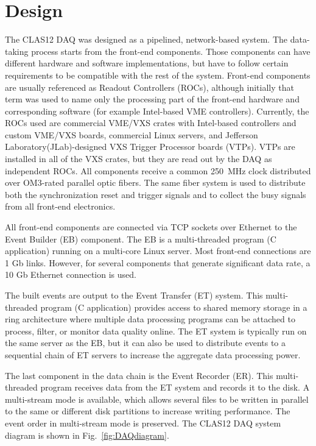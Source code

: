 \section{Design}

The CLAS12 DAQ was designed as a pipelined, network-based system. The data-taking process starts from the front-end components. Those components can have different hardware and software implementations, but have to follow certain requirements to be compatible with the rest of the system. Front-end components are usually referenced as Readout Controllers (ROCs), although initially that term was used to name only the processing part of the front-end hardware and corresponding software (for example Intel-based VME controllers). Currently, the ROCs used are commercial VME/VXS crates with Intel-based controllers and custom VME/VXS boards, commercial Linux servers, and Jefferson Laboratory(JLab)-designed VXS Trigger Processor boards (VTPs). VTPs are installed in all of the VXS crates, but they are read out by the DAQ as independent ROCs. All components receive a common 250~MHz clock distributed over OM3-rated parallel optic fibers. The same fiber system is used to distribute both the synchronization reset and trigger signals and to collect the busy signals from all front-end electronics.

All front-end components are connected via TCP sockets over Ethernet to the Event Builder (EB) component. The EB is a multi-threaded program (C application) running on a multi-core Linux server. Most front-end connections are 1 Gb links. However, for several components that generate significant data rate, a 10 Gb Ethernet connection is used.

The built events are output to the Event Transfer (ET) system. This multi-threaded program (C application) provides access to shared memory storage in a ring architecture where multiple data processing programs can be attached to process, filter, or monitor data quality online. The ET system is typically run on the same server as the EB, but it can also be used to distribute events to a sequential chain of ET servers to increase the aggregate data processing power.

The last component in the data chain is the Event Recorder (ER). This multi-threaded program receives data from the ET system and records it to the disk. A multi-stream mode is available, which allows several files to be written in parallel to the same or different disk partitions to increase writing performance. The event order in multi-stream mode is preserved. The CLAS12 DAQ system diagram is shown in Fig.~\ref{fig:DAQdiagram}.

